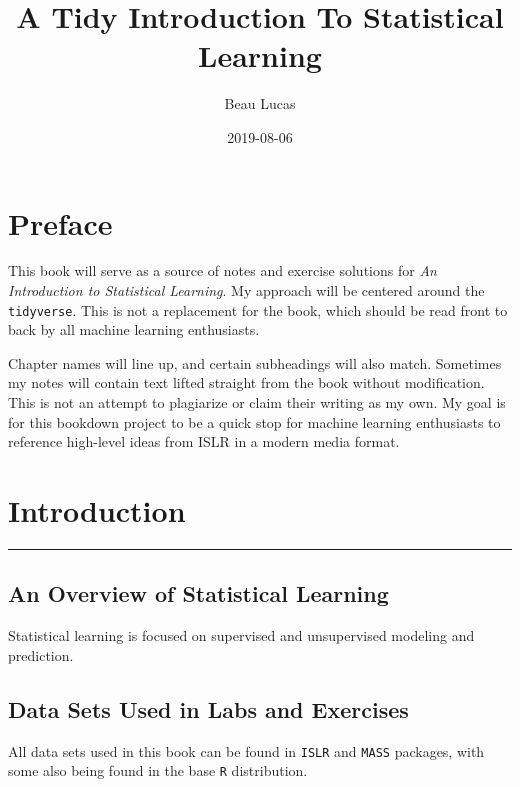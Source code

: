 \documentclass[]{book}
\title{A Tidy Introduction To Statistical Learning}
\author{Beau Lucas}
\date{2019-08-06}
\begin{document}
\maketitle

{
\setcounter{tocdepth}{1}
\tableofcontents
}
\hypertarget{preface}{%
\chapter*{Preface}\label{preface}}

This book will serve as a source of notes and exercise solutions for \emph{An Introduction to Statistical Learning}. My approach will be centered around the \texttt{tidyverse}. This is not a replacement for the book, which should be read front to back by all machine learning enthusiasts.

Chapter names will line up, and certain subheadings will also match. Sometimes my notes will contain text lifted straight from the book without modification. This is not an attempt to plagiarize or claim their writing as my own. My goal is for this bookdown project to be a quick stop for machine learning enthusiasts to reference high-level ideas from ISLR in a modern media format.

\hypertarget{intro}{%
\chapter{Introduction}\label{intro}}

\begin{center}\rule{0.5\linewidth}{\linethickness}\end{center}

\hypertarget{an-overview-of-statistical-learning}{%
\section{An Overview of Statistical Learning}\label{an-overview-of-statistical-learning}}

Statistical learning is focused on supervised and unsupervised modeling and prediction.

\hypertarget{data-sets-used-in-labs-and-exercises}{%
\section{Data Sets Used in Labs and Exercises}\label{data-sets-used-in-labs-and-exercises}}

All data sets used in this book can be found in \texttt{ISLR} and \texttt{MASS} packages, with some also being found in the base \texttt{R} distribution.
\end{document}
